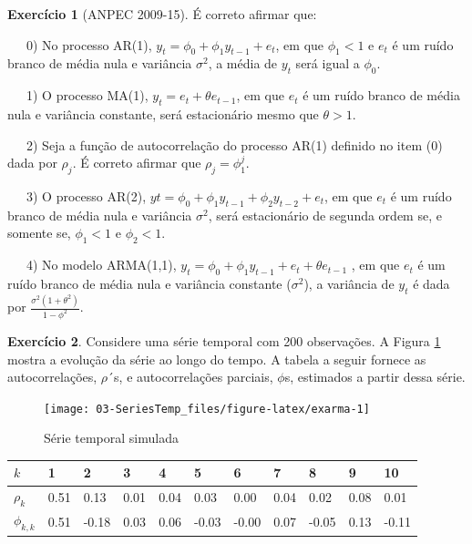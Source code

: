 \documentclass[
]{book}
\theoremstyle{definition}
\theoremstyle{definition}
\theoremstyle{definition}
\newtheorem{exercise}{Exercício}[chapter]
\theoremstyle{remark}
\begin{document}
\begin{exercise}[ANPEC 2009-15]
\protect\hypertarget{exr:a0915}{}{\label{exr:a0915} {} }É correto afirmar que:

~~~0) No processo AR(1), \(y_t = \phi_0 + \phi_1 y_{t-1} + e_t\), em que \(\phi_1 < 1\) e \(e_t\) é um ruído branco de média nula e variância \(\sigma^2\), a média de \(y_t\) será igual a \(\phi_0\).

~~~1) O processo MA(1), \(y_t = e_t + \theta e_{t-1}\), em que \(e_t\) é um ruído branco de média nula e variância constante, será estacionário mesmo que \(\theta > 1\).

~~~2) Seja a função de autocorrelação do processo AR(1) definido no item (0) dada por \(\rho_j\). É correto afirmar que \(\rho_j = \phi_1^j\).

~~~3) O processo AR(2), \(y t = \phi_0 + \phi_1 y_{t-1} + \phi_2 y_{t-2} + e_t\), em que \(e_t\) é um ruído branco de média nula e variância \(\sigma^2\), será estacionário de segunda ordem se, e somente se, \(\phi_1 < 1\) e \(\phi_2 < 1\).

~~~4) No modelo ARMA(1,1), \(y_t = \phi_0 + \phi_1 y_{t-1} + e_t + \theta e_{t-1}\) , em que \(e_t\) é um ruído branco de média nula e variância constante (\(\sigma^2\)), a variância de \(y_t\) é dada por \(\frac{\sigma^2(1+\theta^2)}{1-\phi^2}\).
\end{exercise}

\begin{exercise}
\protect\hypertarget{exr:s200}{}{\label{exr:s200} }Considere uma série temporal com 200 observações. A Figura \ref{fig:exarma} mostra a evolução da série ao longo do tempo. A tabela a seguir fornece as autocorrelações, \(\rho\)´s, e autocorrelações parciais, \(\phi\)s, estimados a partir dessa série.
\end{exercise}

\begin{figure}
\texttt{[image: 03-SeriesTemp\_files/figure-latex/exarma-1]} \caption{Série temporal simulada}\label{fig:exarma}
\end{figure}

\begin{longtable}[]{@{}lllllllllll@{}}
\toprule
\(k\) & 1 & 2 & 3 & 4 & 5 & 6 & 7 & 8 & 9 & 10\tabularnewline
\midrule
\endhead
\(\rho_k\) & 0.51 & 0.13 & 0.01 & 0.04 & 0.03 & 0.00 & 0.04 & 0.02 & 0.08 & 0.01\tabularnewline
\(\phi_{k,k}\) & 0.51 & -0.18 & 0.03 & 0.06 & -0.03 & -0.00 & 0.07 & -0.05 & 0.13 & -0.11\tabularnewline
\bottomrule
\end{longtable}
\end{document}
